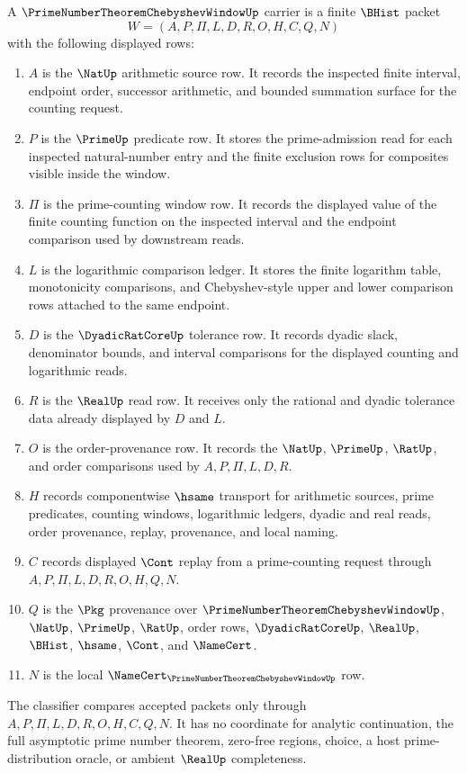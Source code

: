 \begin{definition}
\label{def:prime-number-theorem-chebyshev-window-carrier}
A $\PrimeNumberTheoremChebyshevWindowUp$ carrier is a finite $\BHist$ packet
$$
W=(A,P,\Pi,L,D,R,O,H,C,Q,N)
$$
with the following displayed rows:
\begin{enumerate}
\item $A$ is the $\NatUp$ arithmetic source row. It records the inspected finite interval, endpoint order, successor arithmetic, and bounded summation surface for the counting request.
\item $P$ is the $\PrimeUp$ predicate row. It stores the prime-admission read for each inspected natural-number entry and the finite exclusion rows for composites visible inside the window.
\item $\Pi$ is the prime-counting window row. It records the displayed value of the finite counting function on the inspected interval and the endpoint comparison used by downstream reads.
\item $L$ is the logarithmic comparison ledger. It stores the finite logarithm table, monotonicity comparisons, and Chebyshev-style upper and lower comparison rows attached to the same endpoint.
\item $D$ is the $\DyadicRatCoreUp$ tolerance row. It records dyadic slack, denominator bounds, and interval comparisons for the displayed counting and logarithmic reads.
\item $R$ is the $\RealUp$ read row. It receives only the rational and dyadic tolerance data already displayed by $D$ and $L$.
\item $O$ is the order-provenance row. It records the $\NatUp$, $\PrimeUp$, $\RatUp$, and order comparisons used by $A,P,\Pi,L,D,R$.
\item $H$ records componentwise $\hsame$ transport for arithmetic sources, prime predicates, counting windows, logarithmic ledgers, dyadic and real reads, order provenance, replay, provenance, and local naming.
\item $C$ records displayed $\Cont$ replay from a prime-counting request through $A,P,\Pi,L,D,R,O,H,Q,N$.
\item $Q$ is the $\Pkg$ provenance over $\PrimeNumberTheoremChebyshevWindowUp$, $\NatUp$, $\PrimeUp$, $\RatUp$, order rows, $\DyadicRatCoreUp$, $\RealUp$, $\BHist$, $\hsame$, $\Cont$, and $\NameCert$.
\item $N$ is the local $\NameCert_{\PrimeNumberTheoremChebyshevWindowUp}$ row.
\end{enumerate}
The classifier compares accepted packets only through $A,P,\Pi,L,D,R,O,H,C,Q,N$. It has no coordinate for analytic continuation, the full asymptotic prime number theorem, zero-free regions, choice, a host prime-distribution oracle, or ambient $\RealUp$ completeness.
\end{definition}

